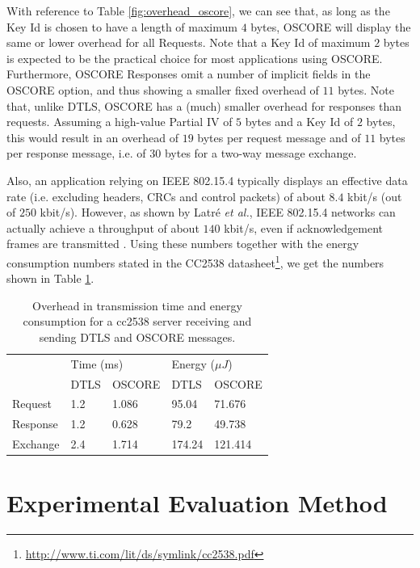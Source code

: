{With reference to Table \ref{fig:overhead_oscore}, we can see that, as long as the Key Id is chosen to have a length of maximum $4$ bytes, OSCORE will display the same or lower overhead for all Requests. Note that a Key Id of maximum $2$ bytes is expected to be the practical choice for most applications using OSCORE. Furthermore, OSCORE Responses omit a number of implicit fields in the OSCORE option, and thus showing a smaller fixed overhead of $11$ bytes. Note that, unlike DTLS, OSCORE has a (much) smaller overhead for responses than requests. Assuming a high-value Partial IV of $5$ bytes and a Key Id of $2$ bytes, this would result in an overhead of $19$ bytes per request message and of $11$ bytes per response message, i.e. of $30$ bytes for a two-way message exchange.

Also, an application relying on IEEE 802.15.4 typically displays an effective data rate (i.e. excluding headers, CRCs and control packets) of about $8.4$ kbit/s (out of $250$ kbit/s). However, as shown by Latr\'{e} \emph{et al.}, IEEE 802.15.4 networks can actually achieve a throughput of about $140$ kbit/s, even if acknowledgement frames are transmitted \cite{latre:2005}. Using these numbers together with the energy consumption numbers stated in the CC2538 datasheet\footnote{\url{http://www.ti.com/lit/ds/symlink/cc2538.pdf}}, we get the numbers shown in Table \ref{tab:overhead}.
\begin{table}[ht]
\center

\begin{tabular}{l|ll|ll}
         & \multicolumn{2}{l}{Time (ms)} & \multicolumn{2}{l}{Energy ($\mu J$)} \\ 
         & DTLS         & OSCORE         & DTLS                   & OSCORE                  \\ \hline
Request  & 1.2          & 1.086          & 95.04                  & 71.676                  \\
Response & 1.2          & 0.628          & 79.2                   & 49.738                  \\
Exchange & 2.4          & 1.714          & 174.24                 & 121.414                

\end{tabular}
\caption{Overhead in transmission time and energy consumption for a cc2538 server receiving and sending DTLS and OSCORE messages.}
\label{tab:overhead}
\end{table}

\section{Experimental Evaluation Method}
\label{sec:measure}

}

